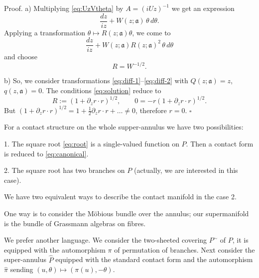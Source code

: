 \documentclass[]{amsart}
\newcounter{sec}
\def\fra{\mathfrak a}
\def\wh{\widehat}
\def\sm{\smallskip}
\begin{document}
{\sc Proof.}
a)
Multiplying \eqref{eq:UzVtheta} by $A=(iUz)^{-1}$ we get an expression
\begin{equation}
	\frac{dz}{iz}+ W(z;\fra)\,\theta\,d\theta.
	\label{eq:zW}
\end{equation}
Applying a transformation
$
\theta\mapsto R(z;\fra) \theta
$, 
we come to
$$
\frac{dz}{iz}
+ W(z;\fra) R(z;\fra)^2 \,\theta\,d\theta
$$
and choose 
\begin{equation}
R=W^{-1/2}.
\label{eq:root}
\end{equation}

b) So, we consider transformations \eqref{eq:diff-1}--\eqref{eq:diff-2} with $Q(z;\fra)=z$,
$q(z,\fra)=0$. The conditions \eqref{eq:solution}  reduce to
$$
R:=(1+\partial_z r\cdot r)^{1/2},\qquad 0=-r (1+\partial_z r\cdot r)^{1/2}.
$$
But $(1+\partial_z r\cdot r)^{1/2}=1+\frac 12 \partial_z r\cdot r+\dots\ne 0$, therefore
$r=0$.
\hfill $\square$

\sm 

For a contact structure on the whole supper-annulus we have two possibilities:

\sm

1. The square root \eqref{eq:root} is a single-valued function on $P$. Then a contact form is reduced 
to \eqref{eq:canonical}.

\sm 

2. The square root has two branches on $P$ (actually, we are interested in this case). 

\sm 

We have two equivalent ways to describe the contact manifold in the case 2.

\sm 

One way is to consider the M\"obious bundle over the annulus; our supermanifold is the
bundle of Grassmann algebras on fibres.

\sm 

We prefer another language.
We  consider
the 
two-sheeted covering $P^\sim$ of $P$, it is equipped with the automorphism $\pi$ of permutation of branches. Next consider
the super-annulus $\wh P$ equipped with the standard contact form and the automorphism  $\wh \pi$
sending $(u,\theta)\mapsto (\pi(u),-\theta)$.



\sm
\end{document}
